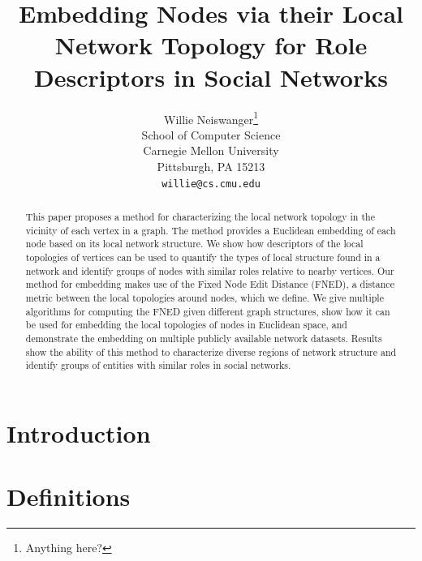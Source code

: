 \documentclass{article}
\title{Embedding Nodes via their Local Network Topology for Role Descriptors in Social Networks}
\author{
Willie Neiswanger\thanks{Anything here?} \\
School of Computer Science\\
Carnegie Mellon University\\
Pittsburgh, PA 15213 \\
\texttt{willie@cs.cmu.edu} \\
}
\begin{document}
\maketitle

\begin{abstract}
This paper proposes a method for characterizing the local network topology in the vicinity of each vertex in a graph. The method provides a Euclidean embedding of each node based on its local network structure. We show how descriptors of the local topologies of vertices can be used to quantify the types of local structure found in a network and identify groups of nodes with similar roles relative to nearby vertices. Our method for embedding makes use of the Fixed Node Edit Distance (FNED), a distance metric between the local topologies around nodes, which we define. We give multiple algorithms for computing the FNED given different graph structures, show how it can be used for embedding the local topologies of nodes in Euclidean space, and demonstrate the embedding on multiple publicly available network datasets. Results show the ability of this method to characterize diverse regions of network structure and identify groups of entities with similar roles in social networks.
\end{abstract}


\section{Introduction}
\label{sec:intro}

\section{Definitions}
\label{sec:defs}
\end{document}
